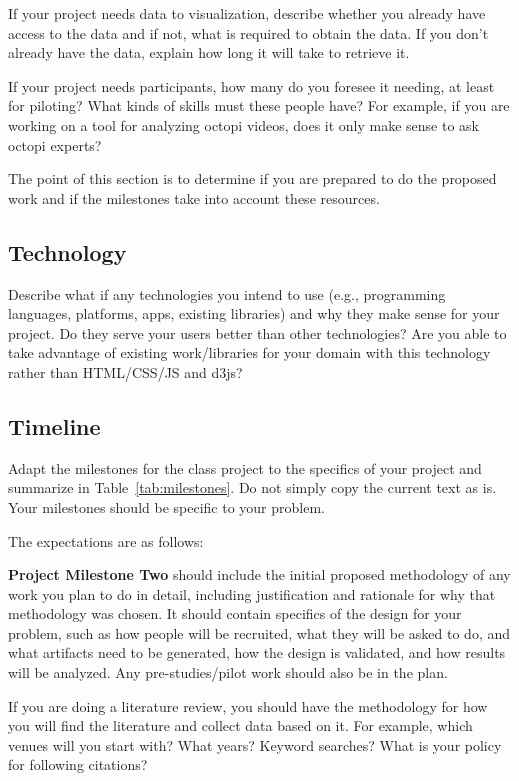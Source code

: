 If your project needs data to visualization, describe whether you already have
access to the data and if not, what is required to obtain the data. If you
don't already have the data, explain how long it will take to retrieve it. 

If your project needs participants, how many do you foresee it needing, at
least for piloting? What kinds of skills must these people have? For example,
if you are working on a tool for analyzing octopi videos, does  it only make
sense to ask octopi experts?

The point of this section is to determine if you are prepared to do the
proposed work and if the milestones take into account these resources.

\subsection{Technology}
\label{sec:tech}

Describe what if any technologies you intend to use (e.g., programming
languages, platforms, apps, existing libraries) and why they make sense for
your project. Do they serve your users better than other technologies? Are you
able to take advantage of existing work/libraries for your domain with this
technology rather than HTML/CSS/JS and d3js?  

\subsection{Timeline}
\label{sec:timeline}

Adapt the milestones for the class project to the specifics of your project
and summarize in Table~\ref{tab:milestones}. Do not simply copy the current
text as is. Your milestones should be specific to your problem.

The expectations are as follows:

\vspace{1.5ex}\noindent\textbf{Project Milestone Two} should include the
initial proposed methodology of any work you plan to do in detail, including
justification and rationale for why that methodology was chosen. It should
contain specifics of the design for your problem, such as how people will be
recruited, what they will be asked to do, and what artifacts need to be
generated, how the design is validated, and how results will be analyzed. Any
pre-studies/pilot work should also be in the plan.

If you are doing a literature review, you should have the methodology for how
you will find the literature and collect data based on it. For example, which
venues will you start with? What years? Keyword searches? What is your policy
for following citations?

